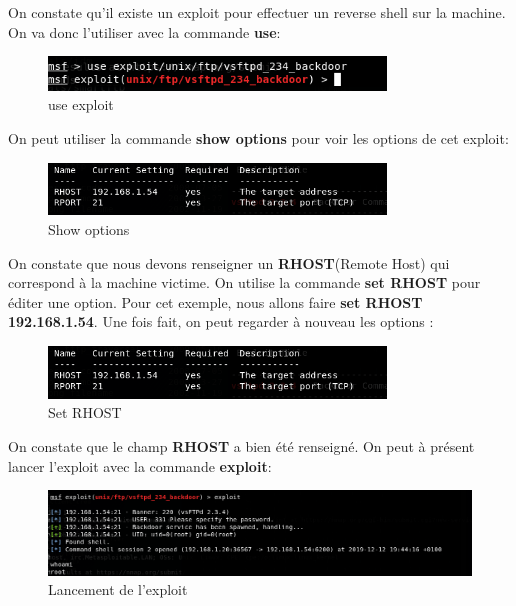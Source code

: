 On constate qu'il existe un exploit pour effectuer un reverse shell sur la machine. On va donc l'utiliser avec la commande \textbf{use}:

\begin{figure}[htp!]
  \centering
  \setlength\figureheight{7cm}
  \setlength\figurewidth{9cm}
  \includegraphics[width=0.8\textwidth]{oui/Ancien/imangeancien/metasploit/ftp5.PNG}
  \caption{use exploit}
  \label{fig:courbe-tikz}
\end{figure}

 On peut utiliser la commande \textbf{show options} pour voir les options de cet exploit:

\begin{figure}[htp!]
  \centering
  \setlength\figureheight{7cm}
  \setlength\figurewidth{9cm}
  \includegraphics[width=0.8\textwidth]{oui/Ancien/imangeancien/metasploit/ftp3.PNG}
  \caption{Show options}
  \label{fig:courbe-tikz}
\end{figure}

\newpage
On constate que nous devons renseigner un \textbf{RHOST}(Remote Host) qui correspond à la machine victime. On utilise la commande \textbf{set RHOST} pour éditer une option. Pour cet exemple, nous allons faire \textbf{set RHOST 192.168.1.54}. Une fois fait, on peut regarder à nouveau les options : 


\begin{figure}[htp!]
  \centering
  \setlength\figureheight{7cm}
  \setlength\figurewidth{9cm}
  \includegraphics[width=0.8\textwidth]{oui/Ancien/imangeancien/metasploit/ftp3.PNG}
  \caption{Set RHOST}
  \label{fig:courbe-tikz}
\end{figure}

On constate que le champ \textbf{RHOST} a bien été renseigné. On peut à présent lancer l'exploit avec la commande \textbf{exploit}:

\begin{figure}[htp!]
  \centering
  \setlength\figureheight{7cm}
  \setlength\figurewidth{9cm}
  \includegraphics[width=1\textwidth]{oui/Ancien/imangeancien/metasploit/ftp4.PNG}
  \caption{Lancement de l'exploit}
  \label{fig:courbe-tikz}
\end{figure}

